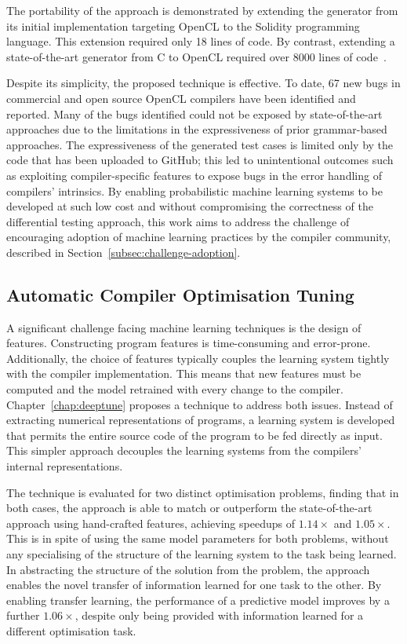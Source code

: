 The portability of the approach is demonstrated by extending the generator from its initial implementation targeting OpenCL to the Solidity programming language. This extension required only 18 lines of code. By contrast, extending a state-of-the-art generator from C to OpenCL required over 8000 lines of code~\cite{Lidbury2015a}.

Despite its simplicity, the proposed technique is effective. To date, 67 new bugs in commercial and open source OpenCL compilers have been identified and reported. Many of the bugs identified could not be exposed by state-of-the-art approaches due to the limitations in the expressiveness of prior grammar-based approaches. The expressiveness of the generated test cases is limited only by the code that has been uploaded to GitHub; this led to unintentional outcomes such as exploiting compiler-specific features to expose bugs in the error handling of compilers' intrinsics. By enabling probabilistic machine learning systems to be developed at such low cost and without compromising the correctness of the differential testing approach, this work aims to address the challenge of encouraging adoption of machine learning practices by the compiler community, described in Section~\ref{subsec:challenge-adoption}.


\subsection{Automatic Compiler Optimisation Tuning}

A significant challenge facing machine learning techniques is the design of features. Constructing program features is time-consuming and error-prone. Additionally, the choice of features typically couples the learning system tightly with the compiler implementation. This means that new features must be computed and the model retrained with every change to the compiler. Chapter~\ref{chap:deeptune} proposes a technique to address both issues. Instead of extracting numerical representations of programs, a learning system is developed that permits the entire source code of the program to be fed directly as input. This simpler approach decouples the learning systems from the compilers' internal representations.

The technique is evaluated for two distinct optimisation problems, finding that in both cases, the approach is able to match or outperform the state-of-the-art approach using hand-crafted features, achieving speedups of $1.14\times$ and $1.05\times$. This is in spite of using the same model parameters for both problems, without any specialising of the structure of the learning system to the task being learned. In abstracting the structure of the solution from the problem, the approach enables the novel transfer of information learned for one task to the other. By enabling transfer learning, the performance of a predictive model improves by a further $1.06\times$, despite only being provided with information learned for a different optimisation task.

